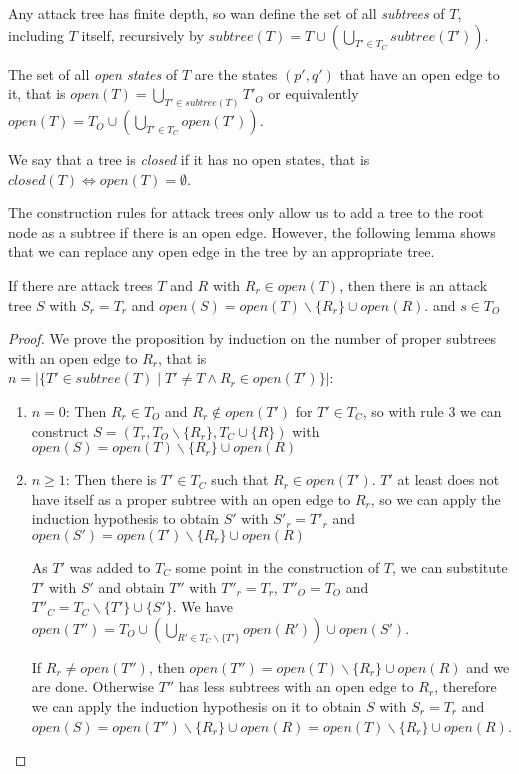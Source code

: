 \begin{definition}
  Any attack tree has finite depth, so wan define
  the set of all \emph{subtrees} of $T$, including $T$ itself, recursively by
  $subtree(T) = T ∪ \left(⋃_{T' ∈ T_C} subtree(T') \right)$.
  
  The set of all \emph{open states} of $T$ are the states $(p',q')$ that
  have an open edge to it, that is $open(T) = ⋃_{T' ∈ subtree(T)} T'_O$
  or equivalently $open(T) = T_O ∪ \left(⋃_{T' ∈ T_C} open(T') \right)$.
  
  We say that a tree is \emph{closed} if it has no open states, that is
  $closed(T) \iff open(T) = ∅$.
\end{definition}

The construction rules for attack trees only allow us to add a tree
to the root node as a subtree if there is an open edge.
However, the following lemma shows that we can replace any open edge
in the tree by an appropriate tree.

\begin{lemma}
  \label{lemma:tree-composition}
  If there are attack trees $T$ and $R$ with
  $R_r ∈ open(T)$,
  then there is an attack tree $S$ with
  $S_r = T_r$ and
  $open(S) = open(T) ∖ \{R_r\} ∪ open(R)$.
  and $s ∈ T_O$
\end{lemma}
\begin{proof}
  We prove the proposition by induction on the number of proper subtrees
  with an open edge to $R_r$, that is
  $n = |\{ T' ∈ subtree(T) \mid T' ≠ T ∧ R_r ∈ open(T')\}|$:
  \begin{enumerate}
    \item $n = 0$:
      Then $R_r ∈ T_O$ and $R_r ∉ open(T')$ for $T' ∈ T_C$,
      so with rule 3 we can construct
      $S = (T_r, T_O ∖ \{R_r\}, T_C ∪ \{R\})$ with
      $open(S) = open(T) ∖ \{R_r\} ∪ open(R)$
    \item $n ≥ 1$:
      Then there is $T' ∈ T_C$ such that $R_r ∈ open(T')$.
      $T'$ at least does not have itself as a proper subtree
      with an open edge to $R_r$, so we can apply
      the induction hypothesis to obtain
      $S'$ with $S'_r = T'_r$ and
      $open(S') = open(T') ∖ \{R_r\} ∪ open(R)$

      As $T'$ was added to $T_C$ some point in the construction of $T$,
      we can substitute $T'$ with $S'$ and obtain
      $T''$ with $T''_r = T_r$, $T''_O = T_O$ and
      $T''_C = T_C ∖ \{T'\} ∪ \{S'\}$.
      We have $open(T'') = T_O ∪ \left(⋃_{R' ∈ T_C ∖ \{T'\} } open(R')\right) ∪ open(S')$.

      If $R_r ≠ open(T'')$, then $open(T'') = open(T) ∖ \{R_r\} ∪ open(R)$ and we are done.
      Otherwise $T''$ has less subtrees with an open edge to
      $R_r$, therefore we
      can apply the induction hypothesis on it to obtain
      $S$ with $S_r = T_r$ and
      $open(S) = open(T'') ∖ \{R_r\} ∪ open(R) = open(T) ∖ \{R_r\} ∪ open(R)$.
  \end{enumerate}
\end{proof}

